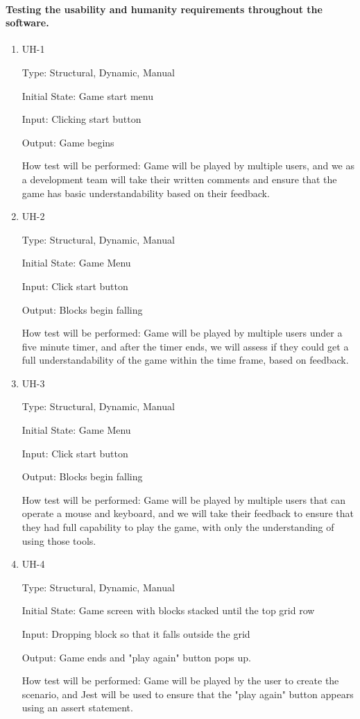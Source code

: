 \documentclass[12pt, titlepage]{article}
\begin{document}
\paragraph{Testing the usability and humanity requirements throughout the software.}
\begin{enumerate}

\item{UH-1\\}

Type: Structural, Dynamic, Manual
					
Initial State: Game start menu
					
Input: Clicking start button 
					
Output: Game begins
					
How test will be performed: Game will be played by multiple users, and we as a development team will take their written comments and ensure that the game has basic understandability based on their feedback. 

\item{UH-2\\}

Type: Structural, Dynamic, Manual
					
Initial State: Game Menu 
					
Input: Click start button 
					
Output: Blocks begin falling
					
How test will be performed: Game will be played by multiple users under a five minute timer, and after the timer ends, we will assess if they could get a full understandability of the game within the time frame, based on feedback. 

\item{UH-3\\}

Type: Structural, Dynamic, Manual
					
Initial State: Game Menu 
					
Input: Click start button 
					
Output: Blocks begin falling
					
How test will be performed: Game will be played by multiple users that can operate a mouse and keyboard, and we will take their feedback to ensure that they had full capability to play the game, with only the understanding of using those tools. 

\item{UH-4\\}

Type: Structural, Dynamic, Manual
					
Initial State: Game screen with blocks stacked until the top grid row
					
Input: Dropping block so that it falls outside the grid
					
Output: Game ends and "play again" button pops up.
					
How test will be performed: Game will be played by the user to create the scenario, and Jest will be used to ensure that the "play again" button appears using an assert statement. 

\end{enumerate}
\end{document}
